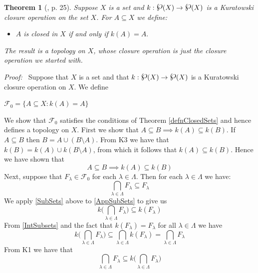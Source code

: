 \documentclass[12pt, oneside]{book}
\newtheorem{theorem}{Theorem}[subsection]
\newcommand{\proof}{{\noindent \it Proof:~}}
\newcommand{\powerset}{\raisebox{.15\baselineskip}{\Large\ensuremath{\wp}}}
\begin{document}
\begin{theorem}[\cite{W2}, p. 25] \label{thmKuratowski}
\normalfont
Suppose $X$ is a set and $k:\powerset(X) \rightarrow \powerset(X)$ is a Kuratowski closure operation 
on the set $X$. For $A \subseteq X$ we define:
\begin{itemize}
\item [K5.]  \quad $A$ is closed in $X$ if and only if $k(A) = A.$
\end{itemize}
The result is a topology on $X$, whose closure operation is just the closure operation we 
started with.
\end{theorem}
\proof \space
Suppose that $X$ is a set and that $k:\powerset(X) \rightarrow \powerset(X)$ is a Kuratowski closure
 operation on $X$. We define
\begin{center}
$\mathscr{F}_0 = \{A \subseteq X : k(A) = A \}$
\end{center}
\noindent We show that $\mathscr{F}_0$ satisfies the conditions of Theorem \ref{defnClosedSets} and hence defines a topology on $X$. 
\vskip 0.3cm
\noindent First we show that $A \subseteq B \implies k(A) \subseteq k(B)$. If $A \subseteq B$ 
then $B = A \cup (B \setminus A)$. From K3 we have that $k(B) = k(A) \cup k(B \setminus A)$, 
from which it follows that $k(A) \subseteq k(B)$. Hence we have shown that
\begin{equation}\label{SubSets}
A \subseteq B \implies k(A) \subseteq k(B)
\end{equation}
Next, suppose that $F_{\lambda} \in \mathscr{F}_0$ for each $\lambda \in \Lambda$. 
Then for each $\lambda \in \Lambda$ we have:
\begin{equation}\label{AppSubSets}
\bigcap\limits_{\lambda \in \Lambda} F_{\lambda} \subseteq F_{\lambda}
\end{equation}
We apply \eqref{SubSets} above to \eqref{AppSubSets} to give us
\begin{equation} \label{IntSubsets}
k\bigg(\bigcap\limits_{\lambda \in \Lambda} F_{\lambda}\bigg) \subseteq k(F_{\lambda})
\end{equation}
From \eqref{IntSubsets} and the fact that  $k(F_{\lambda}) = F_{\lambda}$ for all $\lambda \in \Lambda$
we have
\begin{equation} \label{Inclusion1}
k\bigg(\bigcap\limits_{\lambda \in \Lambda} F_{\lambda}\bigg) 
\subseteq \bigcap\limits_{\lambda \in \Lambda}k(F_{\lambda}) = \bigcap\limits_{\lambda \in \Lambda} F_{\lambda}
\end{equation}
From K1 we have that
\begin{equation} \label{Inclusion2}
\bigcap\limits_{\lambda \in \Lambda} F_{\lambda} \subseteq k\bigg(\bigcap\limits_{\lambda \in \Lambda} F_{\lambda}\bigg)
\end{equation}
\end{document}
